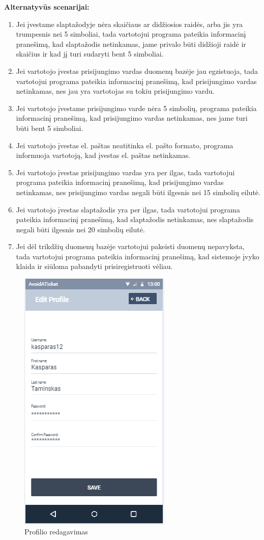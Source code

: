\documentclass{VUMIFPSkursinis}
\begin{document}
	\textbf{Alternatyvūs scenarijai:}
	\begin{enumerate}
		\item Jei įvestame slaptažodyje nėra skaičiaus ar didžiosios raidės, arba jis yra trumpesnis nei 5 simboliai, tada vartotojui programa pateikia informacinį pranešimą, kad slaptažodis netinkamas, jame privalo būti didžioji raidė ir skaičius ir kad jį turi sudaryti bent 5 simboliai.
		\item Jei vartotojo įvestas prisijungimo vardas duomenų bazėje jau egzistuoja, tada vartotojui programa pateikia informacinį pranešimą, kad prisijungimo vardas netinkamas, nes jau yra vartotojas su tokiu prisijungimo vardu.
		\item Jei vartotojo įvestame prisijungimo varde nėra 5 simbolių, programa pateikia informacinį pranešimą, kad prisijungimo vardas netinkamas, nes jame turi būti bent 5 simboliai.
		\item Jei vartotojo įvestas el. paštas neatitinka el. pašto formato, programa informuoja vartotoją, kad įvestas el. paštas netinkamas.
		\item Jei vartotojo įvestas prisijungimo vardas yra per ilgas, tada vartotojui programa pateikia informacinį pranešimą, kad prisijungimo vardas netinkamas, nes prisijungimo vardas negali būti ilgesnis nei 15 simbolių eilutė.
		\item Jei  vartotojo įvestas slaptažodis yra per ilgas, tada vartotojui programa pateikia informacinį pranešimą, kad slaptažodis netinkamas, nes slaptažodis negali būti ilgesnis nei 20 simbolių eilutė.
		\item Jei dėl trikdžių duomenų bazėje vartotojui pakeisti duomenų nepavyksta, tada vartotojui programa pateikia informacinį pranešimą, kad sistemoje įvyko klaida ir siūloma pabandyti prisiregistruoti vėliau.
	\end{enumerate} 
	\begin{figure}[H]
				\centering
				\includegraphics[scale=0.55]{img/mockup_profileedit}
				\caption{Profilio redagavimas}
				\label{img:profilio redagavimas}
			\end{figure}
\end{document}
